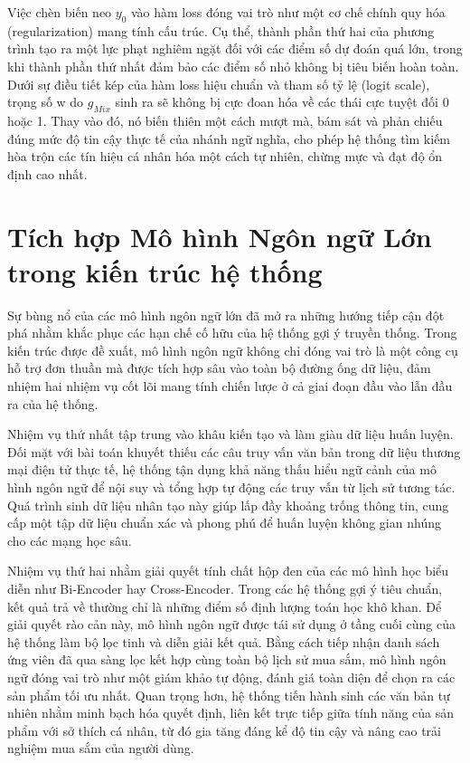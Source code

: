 Việc chèn biến neo $y_0$ vào hàm loss đóng vai trò như một cơ chế chính quy hóa (regularization) mang tính cấu trúc. Cụ thể, thành phần thứ hai của phương trình tạo ra một lực phạt nghiêm ngặt đối với các điểm số dự đoán quá lớn, trong khi thành phần thứ nhất đảm bảo các điểm số nhỏ không bị tiêu biến hoàn toàn. Dưới sự điều tiết kép của hàm loss hiệu chuẩn và tham số tỷ lệ (logit scale), trọng số w do $g_{Mix}$ sinh ra sẽ không bị cực đoan hóa về các thái cực tuyệt đối 0 hoặc 1. Thay vào đó, nó biến thiên một cách mượt mà, bám sát và phản chiếu đúng mức độ tin cậy thực tế của nhánh ngữ nghĩa, cho phép hệ thống tìm kiếm hòa trộn các tín hiệu cá nhân hóa một cách tự nhiên, chừng mực và đạt độ ổn định cao nhất.

\section{Tích hợp Mô hình Ngôn ngữ Lớn trong kiến trúc hệ thống}

Sự bùng nổ của các mô hình ngôn ngữ lớn đã mở ra những hướng tiếp cận đột phá nhằm khắc phục các hạn chế cố hữu của hệ thống gợi ý truyền thống. Trong kiến trúc được đề xuất, mô hình ngôn ngữ không chỉ đóng vai trò là một công cụ hỗ trợ đơn thuần mà được tích hợp sâu vào toàn bộ đường ống dữ liệu, đảm nhiệm hai nhiệm vụ cốt lõi mang tính chiến lược ở cả giai đoạn đầu vào lẫn đầu ra của hệ thống.

Nhiệm vụ thứ nhất tập trung vào khâu kiến tạo và làm giàu dữ liệu huấn luyện. Đối mặt với bài toán khuyết thiếu các câu truy vấn văn bản trong dữ liệu thương mại điện tử thực tế, hệ thống tận dụng khả năng thấu hiểu ngữ cảnh của mô hình ngôn ngữ để nội suy và tổng hợp tự động các truy vấn từ lịch sử tương tác. Quá trình sinh dữ liệu nhân tạo này giúp lấp đầy khoảng trống thông tin, cung cấp một tập dữ liệu chuẩn xác và phong phú để huấn luyện không gian nhúng cho các mạng học sâu.

Nhiệm vụ thứ hai nhằm giải quyết tính chất hộp đen của các mô hình học biểu diễn như Bi-Encoder hay Cross-Encoder. Trong các hệ thống gợi ý tiêu chuẩn, kết quả trả về thường chỉ là những điểm số định lượng toán học khô khan. Để giải quyết rào cản này, mô hình ngôn ngữ được tái sử dụng ở tầng cuối cùng của hệ thống làm bộ lọc tinh và diễn giải kết quả. Bằng cách tiếp nhận danh sách ứng viên đã qua sàng lọc kết hợp cùng toàn bộ lịch sử mua sắm, mô hình ngôn ngữ đóng vai trò như một giám khảo tự động, đánh giá toàn diện để chọn ra các sản phẩm tối ưu nhất. Quan trọng hơn, hệ thống tiến hành sinh các văn bản tự nhiên nhằm minh bạch hóa quyết định, liên kết trực tiếp giữa tính năng của sản phẩm với sở thích cá nhân, từ đó gia tăng đáng kể độ tin cậy và nâng cao trải nghiệm mua sắm của người dùng.
